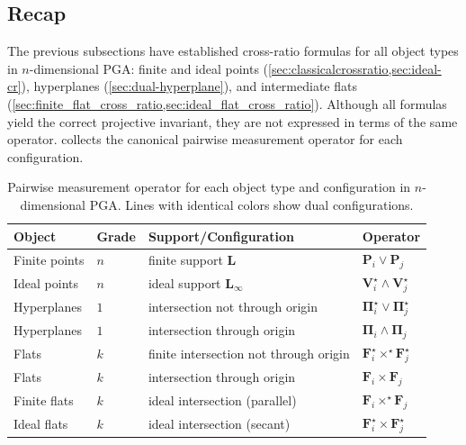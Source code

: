 \documentclass{birkjour}
\theoremstyle{definition}
\theoremstyle{remark}
\begin{document}
\subsection{Recap}
\label{sec:recap}
The previous subsections have established cross-ratio formulas for all object types in $n$-dimensional PGA: finite and ideal points (\cref{sec:classicalcrossratio,sec:ideal-cr}), hyperplanes (\cref{sec:dual-hyperplane}), and intermediate flats (\cref{sec:finite_flat_cross_ratio,sec:ideal_flat_cross_ratio}). Although all formulas yield the correct projective invariant, they are not expressed in terms of the same operator.  collects the canonical pairwise measurement operator for each configuration.

\begin{table}[H]
\centering
\caption{Pairwise measurement operator for each object type and configuration in $n$-dimensional PGA. Lines with identical colors show dual configurations.}
\label{tab:cr-formulas}
\setlength{\tabcolsep}{5pt}
\begin{tabular}{@{}llll@{}}
\toprule
Object & Grade & Support/Configuration & Operator \\
\midrule
\rowcolor{C0!15}
Finite points  & $n$ & finite support $\mathbf{L}$
  & $\mathbf{P}_i \vee \mathbf{P}_j$ \\
\rowcolor{C1!15}
Ideal points   & $n$ & ideal support $\mathbf{L}_\infty$
  & $\mathbf{V}_i^\star \wedge \mathbf{V}_j^\star$ \\
\midrule
\rowcolor{C0!15}
Hyperplanes    & $1$ & intersection not through origin
  & $\boldsymbol{\Pi}_i^\star \vee \boldsymbol{\Pi}_j^\star$ \\
\rowcolor{C1!15}
Hyperplanes    & $1$ & intersection through origin
  & $\boldsymbol{\Pi}_i \wedge \boldsymbol{\Pi}_j$ \\
\midrule
\rowcolor{C2!15}
Flats          & $k$ & finite intersection not through origin
  & $\mathbf{F}_i^\star \times^\star \mathbf{F}_j^\star$ \\
\rowcolor{C3!15}
Flats          & $k$ & intersection through origin
  & $\mathbf{F}_i \times \mathbf{F}_j$ \\
\rowcolor{C2!15}
Finite flats   & $k$ & ideal intersection (parallel)
  & $\mathbf{F}_i \times^\star \mathbf{F}_j$ \\
\rowcolor{C3!15}
Ideal flats    & $k$ & ideal intersection (secant)
  & $\mathbf{F}_i^\star \times \mathbf{F}_j^\star$ \\
\bottomrule
\end{tabular}
\end{table}
\end{document}
